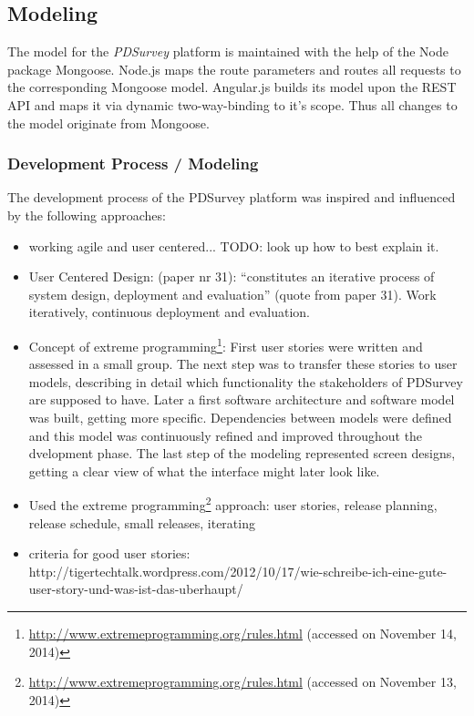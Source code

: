 \subsection{Modeling}
\label{4c_modeling}

	The model for the \textit{PDSurvey} platform is maintained with the help of the Node package Mongoose. Node.js maps the route parameters and routes all requests to the corresponding Mongoose model. Angular.js builds its model upon the REST API and maps it via dynamic two-way-binding to it's scope. Thus all changes to the model originate from Mongoose.



\subsubsection{Development Process / Modeling}

	The development process of the PDSurvey platform was inspired and influenced by the following approaches:

	\begin{itemize}
	\item working agile and user centered... TODO: look up how to best explain it.

	\item User Centered Design: (paper nr 31): ``constitutes an iterative process of system design, deployment and evaluation'' (quote from paper 31). Work iteratively, continuous deployment and evaluation.

	\item Concept of extreme programming\footnote{\url{http://www.extremeprogramming.org/rules.html} (accessed on November 14, 2014)}: First user stories were written and assessed in a small group. The next step was to transfer these stories to user models, describing in detail which functionality the stakeholders of PDSurvey are supposed to have. Later a first software architecture and software model was built, getting more specific. Dependencies between models were defined and this model was continuously refined and improved throughout the dvelopment phase. The last step of the modeling represented screen designs, getting a clear view of what the interface might later look like.

	\item Used the extreme programming\footnote{\url{http://www.extremeprogramming.org/rules.html} (accessed on November 13, 2014)} approach: user stories, release planning, release schedule, small releases, iterating


	\item criteria for good user stories: http://tigertechtalk.wordpress.com/2012/10/17/wie-schreibe-ich-eine-gute-user-story-und-was-ist-das-uberhaupt/
	\end{itemize}









